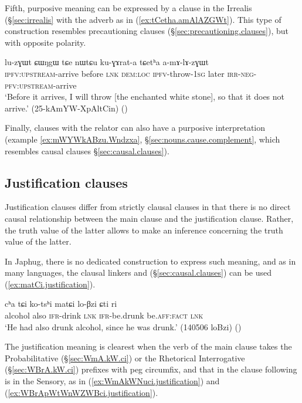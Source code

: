  Fifth, purposive meaning can be expressed by a clause in the Irrealis (§\ref{sec:irrealis} with the adverb  as in (\ref{ex:tCetha.amAlAZGWt}). This type of construction resembles precautioning clauses (§\ref{sec:precautioning.clauses}), but with opposite polarity.

 \begin{exe}
\ex \label{ex:tCetha.amAlAZGWt}
\gll lu-zɣɯt ɕɯŋgɯ tɕe nɯtɕu ku-ɣɤrat-a tɕetʰa a-mɤ-lɤ-zɣɯt \\
\textsc{ipfv}:\textsc{upstream}-arrive before \textsc{lnk} \textsc{dem}:\textsc{loc} \textsc{ipfv}-throw-\textsc{1sg} later \textsc{irr}-\textsc{neg}-\textsc{pfv}:\textsc{upstream}-arrive \\
\glt `Before it arrives, I will throw [the enchanted white stone], so that it does not arrive.' (25-kAmYW-XpAltCin)
()
\end{exe}

Finally, clauses with the relator  can also have a purposive interpretation (example \ref{ex:mWYWkABzu.Wndzxa}, §\ref{sec:nouns.cause.complement}, which resembles causal clauses §\ref{sec:causal.clauses}).

\subsection{Justification clauses} \label{sec:justification.clauses} 
Justification clauses \citep{lopes09justification} differ from strictly clausal clauses in that there is no direct causal  relationship between the main clause and the justification clause. Rather, the truth value of the latter allows to make an inference concerning the truth value of the latter. 

In Japhug, there is no dedicated construction to express such meaning, and as in many languages, the clausal linkers  and  (§\ref{sec:causal.clauses}) can be used (\ref{ex:matCi.justification}). 

\begin{exe}
\ex \label{ex:matCi.justification}
\gll cʰa tɕi ko-tsʰi matɕi lo-βzi ɕti ri \\
alcohol also \textsc{ifr}-drink \textsc{lnk} \textsc{ifr}-be.drunk be.\textsc{aff}:\textsc{fact} \textsc{lnk} \\
\glt `He had also drunk alcohol, since he was drunk.' (140506 loBzi)
()
 \end{exe}

The justification meaning is clearest when the verb of the main clause takes the Probabilitative  (§\ref{sec:WmA.kW.ci}) or the Rhetorical Interrogative  (§\ref{sec:WBrA.kW.ci}) prefixes with peg circumfix, and that in the clause following  is in the Sensory, as in (\ref{ex:WmAkWNuci.justification}) and (\ref{ex:WBrApWtWnWZWBci.justification}).
 

